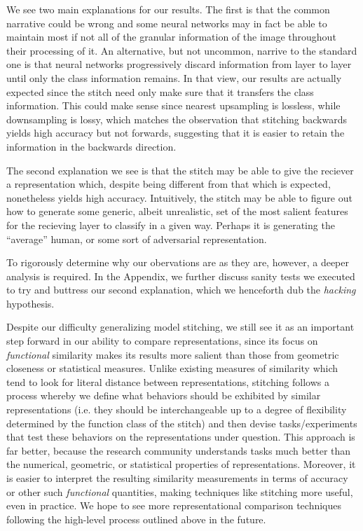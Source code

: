 \documentclass{article}
\begin{document}
We see two main explanations for our results. The first is that the common narrative could be wrong and some neural
networks may in fact be able to maintain most if not all of the granular information of the image throughout their
processing of it. An alternative, but not uncommon, narrive to the standard one is that neural networks progressively 
discard information from layer to layer until only the class information remains. In that view, our results are actually
expected since the stitch need only make sure that it transfers the class information. This could make sense since nearest
upsampling is lossless, while downsampling is lossy, which matches the observation that stitching backwards yields high
accuracy but not forwards, suggesting that it is easier to retain the information in the backwards direction.

The second explanation we see is that the stitch may be able to give the reciever a representation which,
despite being different from that which is expected, nonetheless yields high accuracy. Intuitively, the stitch may be
able to figure out how to generate some generic, albeit unrealistic, set of the most salient features for the
recieving layer to classify in a given way. Perhaps it is generating the ``average'' human, or some sort of adversarial
representation. 

To rigorously determine why our obervations are as they are, however, a deeper analysis is required.
In the Appendix, we further discuss sanity tests we executed to try and buttress our second explanation, which
we henceforth dub the \textit{hacking} hypothesis.

Despite our difficulty generalizing model stitching, we still see it as an important
step forward in our ability to compare representations, since its focus on
\textit{functional} similarity makes its results more salient than those from
geometric closeness or statistical measures. Unlike existing measures of similarity which
tend to look for literal distance between representations, stitching follows a process whereby
we define what behaviors should be exhibited by similar representations (i.e. they should
be interchangeable up to a degree of flexibility determined by the function class of the stitch)
and then devise tasks/experiments that test these behaviors on the representations under question.
This approach is far better, because the research community understands tasks much better than
the numerical, geometric, or statistical properties of representations. Moreover, it is
easier to interpret the resulting similarity measurements in terms of accuracy or other such
\textit{functional} quantities, making techniques like stitching more useful, even in practice.
We hope to see more
representational comparison techniques following the high-level process outlined above in the future.
\end{document}
